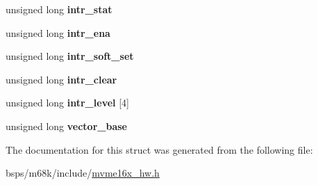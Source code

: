 \begin{DoxyCompactItemize}
\item 
\mbox{\label{structlcsr__regs_ae48573defb389d0ea43576f6b14d8052}} 
unsigned long {\bfseries intr\+\_\+stat}
\item 
\mbox{\label{structlcsr__regs_a5f40e647737cf70dfec3693a62adf54a}} 
unsigned long {\bfseries intr\+\_\+ena}
\item 
\mbox{\label{structlcsr__regs_a30cfe708af1f5ce2136ae16e1320835b}} 
unsigned long {\bfseries intr\+\_\+soft\+\_\+set}
\item 
\mbox{\label{structlcsr__regs_a3361ff960ecf888a7a08990cecfa903f}} 
unsigned long {\bfseries intr\+\_\+clear}
\item 
\mbox{\label{structlcsr__regs_a8b2ac48e9c13c4a6d0a7b50a99adb69c}} 
unsigned long {\bfseries intr\+\_\+level} \mbox{[}4\mbox{]}
\item 
\mbox{\label{structlcsr__regs_a27d7639db922ae7cbcf11193ff9e4618}} 
unsigned long {\bfseries vector\+\_\+base}
\end{DoxyCompactItemize}


The documentation for this struct was generated from the following file\+:\begin{DoxyCompactItemize}
\item 
bsps/m68k/include/\mbox{\hyperlink{mvme16x__hw_8h}{mvme16x\+\_\+hw.\+h}}\end{DoxyCompactItemize}

